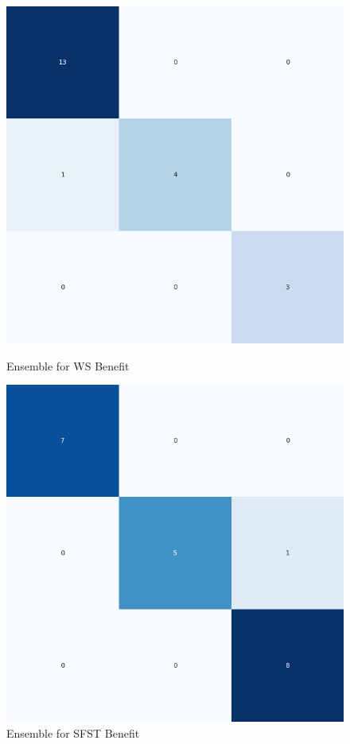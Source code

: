 \begin{figure}[H]
    \centering
    \begin{minipage}[b]{0.45\textwidth}
        \includegraphics[width=\textwidth]{./class_all_section/ensemble_plots/ensemble_confusion_matrix_WS_Benefit.png}
        \caption{Ensemble for WS Benefit}
        \label{fig:ensemble_ws_benefit}
    \end{minipage}
    \hfill
    \begin{minipage}[b]{0.45\textwidth}
        \includegraphics[width=\textwidth]{./class_all_section/ensemble_plots/ensemble_confusion_matrix_SFST_Benefit.png}
        \caption{Ensemble for SFST Benefit}
        \label{fig:ensemble_sfst_benefit}
    \end{minipage}
\end{figure}